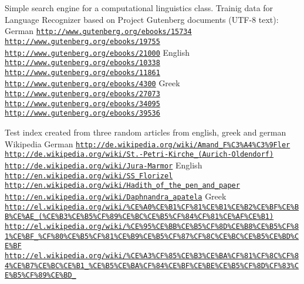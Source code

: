 Simple search engine for a computational linguistics class. Trainig data for Language Recognizer based on Project Gutenberg documents (U\-T\-F-\/8 text)\-: German \href{http://www.gutenberg.org/ebooks/15734}{\tt http\-://www.\-gutenberg.\-org/ebooks/15734} \href{http://www.gutenberg.org/ebooks/19755}{\tt http\-://www.\-gutenberg.\-org/ebooks/19755} \href{http://www.gutenberg.org/ebooks/21000}{\tt http\-://www.\-gutenberg.\-org/ebooks/21000} English \href{http://www.gutenberg.org/ebooks/10338}{\tt http\-://www.\-gutenberg.\-org/ebooks/10338} \href{http://www.gutenberg.org/ebooks/11861}{\tt http\-://www.\-gutenberg.\-org/ebooks/11861} \href{http://www.gutenberg.org/ebooks/4300}{\tt http\-://www.\-gutenberg.\-org/ebooks/4300} Greek \href{http://www.gutenberg.org/ebooks/27073}{\tt http\-://www.\-gutenberg.\-org/ebooks/27073} \href{http://www.gutenberg.org/ebooks/34095}{\tt http\-://www.\-gutenberg.\-org/ebooks/34095} \href{http://www.gutenberg.org/ebooks/39536}{\tt http\-://www.\-gutenberg.\-org/ebooks/39536}

Test index created from three random articles from english, greek and german Wikipedia German \href{http://de.wikipedia.org/wiki/Amand_F%C3%A4%C3%9Fler}{\tt http\-://de.\-wikipedia.\-org/wiki/\-Amand\-\_\-\-F\%\-C3\%\-A4\%\-C3\%9\-Fler} \href{http://de.wikipedia.org/wiki/St.-Petri-Kirche_(Aurich-Oldendorf)}{\tt http\-://de.\-wikipedia.\-org/wiki/\-St.-\/\-Petri-\/\-Kirche\-\_\-(\-Aurich-\/\-Oldendorf)} \href{http://de.wikipedia.org/wiki/Jura-Marmor}{\tt http\-://de.\-wikipedia.\-org/wiki/\-Jura-\/\-Marmor} English \href{http://en.wikipedia.org/wiki/SS_Florizel}{\tt http\-://en.\-wikipedia.\-org/wiki/\-S\-S\-\_\-\-Florizel} \href{http://en.wikipedia.org/wiki/Hadith_of_the_pen_and_paper}{\tt http\-://en.\-wikipedia.\-org/wiki/\-Hadith\-\_\-of\-\_\-the\-\_\-pen\-\_\-and\-\_\-paper} \href{http://en.wikipedia.org/wiki/Daphnandra_apatela}{\tt http\-://en.\-wikipedia.\-org/wiki/\-Daphnandra\-\_\-apatela} Greek \href{http://el.wikipedia.org/wiki/%CE%A0%CE%B1%CF%81%CE%B1%CE%B2%CE%BF%CE%BB%CE%AE_(%CE%B3%CE%B5%CF%89%CE%BC%CE%B5%CF%84%CF%81%CE%AF%CE%B1)}{\tt http\-://el.\-wikipedia.\-org/wiki/\%\-C\-E\%\-A0\%\-C\-E\%\-B1\%\-C\-F\%81\%\-C\-E\%\-B1\%\-C\-E\%\-B2\%\-C\-E\%\-B\-F\%\-C\-E\%\-B\-B\%\-C\-E\%\-A\-E\-\_\-(\%\-C\-E\%\-B3\%\-C\-E\%\-B5\%\-C\-F\%89\%\-C\-E\%\-B\-C\%\-C\-E\%\-B5\%\-C\-F\%84\%\-C\-F\%81\%\-C\-E\%\-A\-F\%\-C\-E\%\-B1)} \href{http://el.wikipedia.org/wiki/%CE%95%CE%BB%CE%B5%CF%8D%CE%B8%CE%B5%CF%81%CE%BF_%CF%80%CE%B5%CF%81%CE%B9%CE%B5%CF%87%CF%8C%CE%BC%CE%B5%CE%BD%CE%BF}{\tt http\-://el.\-wikipedia.\-org/wiki/\%\-C\-E\%95\%\-C\-E\%\-B\-B\%\-C\-E\%\-B5\%\-C\-F\%8\-D\%\-C\-E\%\-B8\%\-C\-E\%\-B5\%\-C\-F\%81\%\-C\-E\%\-B\-F\-\_\-\%\-C\-F\%80\%\-C\-E\%\-B5\%\-C\-F\%81\%\-C\-E\%\-B9\%\-C\-E\%\-B5\%\-C\-F\%87\%\-C\-F\%8\-C\%\-C\-E\%\-B\-C\%\-C\-E\%\-B5\%\-C\-E\%\-B\-D\%\-C\-E\%\-B\-F} \href{http://el.wikipedia.org/wiki/%CE%A3%CF%85%CE%B3%CE%BA%CF%81%CF%8C%CF%84%CE%B7%CE%BC%CE%B1_%CE%B5%CE%BA%CF%84%CE%BF%CE%BE%CE%B5%CF%8D%CF%83%CE%B5%CF%89%CE%BD_19}{\tt http\-://el.\-wikipedia.\-org/wiki/\%\-C\-E\%\-A3\%\-C\-F\%85\%\-C\-E\%\-B3\%\-C\-E\%\-B\-A\%\-C\-F\%81\%\-C\-F\%8\-C\%\-C\-F\%84\%\-C\-E\%\-B7\%\-C\-E\%\-B\-C\%\-C\-E\%\-B1\-\_\-\%\-C\-E\%\-B5\%\-C\-E\%\-B\-A\%\-C\-F\%84\%\-C\-E\%\-B\-F\%\-C\-E\%\-B\-E\%\-C\-E\%\-B5\%\-C\-F\%8\-D\%\-C\-F\%83\%\-C\-E\%\-B5\%\-C\-F\%89\%\-C\-E\%\-B\-D\-\_} 